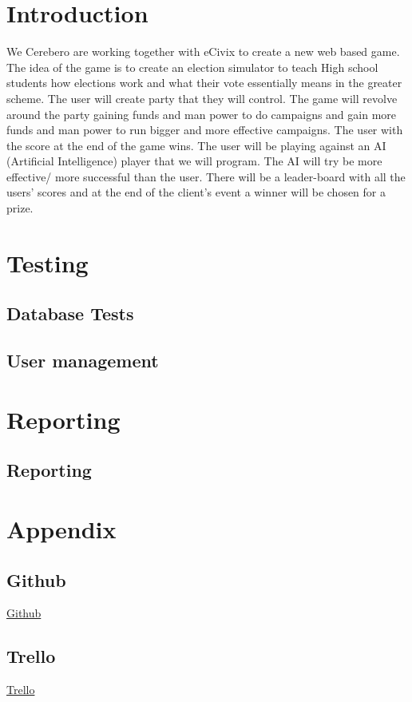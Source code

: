 \documentclass{article}
\begin{document}
  
  

  \tableofcontents
  \newpage

\section{Introduction}
	We Cerebero are working together with eCivix to create a new web based game. The idea of the game is to create an election simulator to teach High school students how elections work and what their vote essentially means in the greater scheme. The user will create party that they will control. The game will revolve around the party gaining funds and man power to do campaigns and gain more funds and man power to run bigger and more effective campaigns. The user with the score at the end of the game wins. The user will be playing against an AI (Artificial Intelligence) player that we will program. The AI will try be more effective/ more successful than the user. There will be a leader-board with all the users' scores and at the end of the client's event a winner will be chosen for a prize. 
	


\section{Testing}
	\subsection{Database Tests}
   	\subsection{User management}
           			
\section{Reporting}
   	\subsection{Reporting}
  
\section{Appendix}
	\subsection{Github}
		\href{https://github.com/KobusMarais/Cerebero}{Github}
	\subsection{Trello}
		\href{https://trello.com/b/WXh8cJZQ/demo-2}{Trello}
\end{document}
